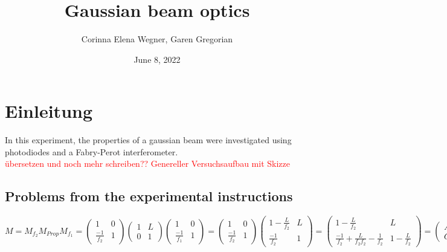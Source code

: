 \documentclass{article}
\begin{document}
 

\begin{titlepage}
\title{Gaussian beam optics}
\author{Corinna Elena Wegner, Garen Gregorian}
\date{June 8, 2022}
\maketitle %
\end{titlepage}

\newpage
\tableofcontents
\newpage

\section{Einleitung} 

In this experiment, the properties of a gaussian beam were investigated using photodiodes and a Fabry-Perot interferometer.
\\
\textcolor{red}{übersetzen und noch mehr schreiben??}
\textcolor{red}{Genereller Versuchsaufbau mit Skizze}

\subsection{Problems from the experimental instructions}

 $M = M_{f_2}M_{Prop}M_{f_1}=\begin{pmatrix}1 & 0\\ \frac{-1}{f_2} & 1
\end{pmatrix}\begin{pmatrix}1 & L\\ 0 & 1
\end{pmatrix}\begin{pmatrix}1 & 0\\ \frac{-1}{f_1} & 1
\end{pmatrix} =\begin{pmatrix}1 & 0\\ \frac{-1}{f_2} & 1
\end{pmatrix}\begin{pmatrix} 1-\frac{L}{f_2} & L\\ \frac{-1}{f_2} & 1
\end{pmatrix} = \begin{pmatrix} 1-\frac{L}{f_2} & L\\ \frac{-1}{f_2}+\frac{L}{f_2 f_2}-\frac{1}{f_2} & 1-\frac{L}{f_2}
\end{pmatrix}
 = \begin{pmatrix} A&B\\C&D\end{pmatrix}$
\end{document}
